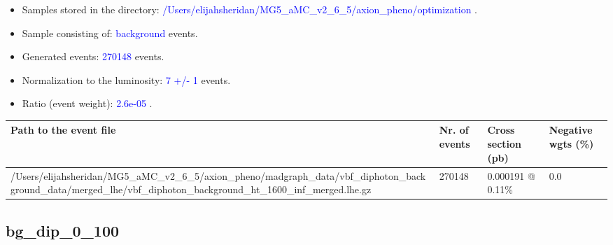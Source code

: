 \documentclass[a4paper, 10pt]{article}
\begin{document}
\begin{itemize}
  \item Samples stored in the directory: \textcolor{blue}{/\-Users/\-elijahsheridan/\-MG5\_aMC\_v2\_6\_5/\-axion\_pheno/\-optimization} .
   \item Sample consisting of: \textcolor{blue}{background}  events.
   \item Generated events: \textcolor{blue}{270148 }  events.
   \item Normalization to the luminosity: \textcolor{blue}{7}\textcolor{blue}{ +/\-- }\textcolor{blue}{1 }  events.
   \item Ratio (event weight): \textcolor{blue}{2.6e-05 } .  
 
\end{itemize}
\begin{table}[H]
  \begin{center}
    \begin{tabular}{|m{55.0mm}|m{25.0mm}|m{30.0mm}|m{30.0mm}|}
      \hline
      {\cellcolor{yellow}         Path to the event file}& {\cellcolor{yellow}         Nr. of events}& {\cellcolor{yellow}         Cross section (pb)}& {\cellcolor{yellow}         Negative wgts (\%)}\\
      \hline
      {\cellcolor{white}          /\-Users/\-elijahsheridan/\-MG5\_aMC\_v2\_6\_5/\-axion\_pheno/\-madgraph\_data/\-vbf\_diphoton\_background\_data/\-merged\_lhe/\-vbf\_diphoton\_background\_ht\_1600\_inf\_merged.lhe.gz}& {\cellcolor{white}          270148}& {\cellcolor{white}          0.000191 @ 0.11\%}& {\cellcolor{white}          0.0}\\
\hline
    \end{tabular}
  \end{center}
\end{table}

\subsection{ bg\_dip\_0\_100}
\end{document}

